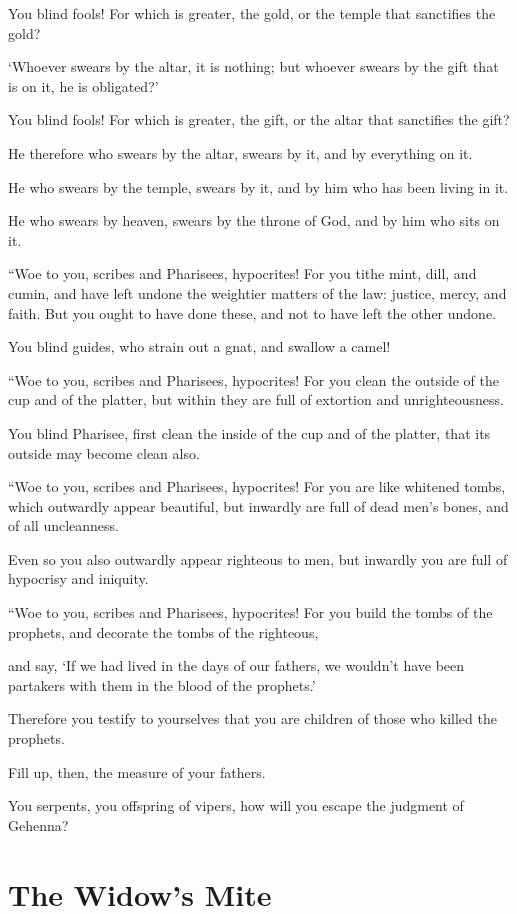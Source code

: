 You blind fools! For which is greater, the gold, or the temple that sanctifies the gold?

‘Whoever swears by the altar, it is nothing; but whoever swears by the gift that is on it, he is obligated?’

You blind fools! For which is greater, the gift, or the altar that sanctifies the gift?

He therefore who swears by the altar, swears by it, and by everything on it.

He who swears by the temple, swears by it, and by him who has been living in it.

He who swears by heaven, swears by the throne of God, and by him who sits on it.

“Woe to you, scribes and Pharisees, hypocrites! For you tithe mint, dill, and cumin, and have left undone the weightier matters of the law: justice, mercy, and faith. But you ought to have done these, and not to have left the other undone.

You blind guides, who strain out a gnat, and swallow a camel!

“Woe to you, scribes and Pharisees, hypocrites! For you clean the outside of the cup and of the platter, but within they are full of extortion and unrighteousness.

You blind Pharisee, first clean the inside of the cup and of the platter, that its outside may become clean also.

“Woe to you, scribes and Pharisees, hypocrites! For you are like whitened tombs, which outwardly appear beautiful, but inwardly are full of dead men’s bones, and of all uncleanness.

Even so you also outwardly appear righteous to men, but inwardly you are full of hypocrisy and iniquity.

“Woe to you, scribes and Pharisees, hypocrites! For you build the tombs of the prophets, and decorate the tombs of the righteous,

and say, ‘If we had lived in the days of our fathers, we wouldn’t have been partakers with them in the blood of the prophets.’

Therefore you testify to yourselves that you are children of those who killed the prophets.

Fill up, then, the measure of your fathers.

You serpents, you offspring of vipers, how will you escape the judgment of Gehenna?


\clearpage \section*{The Widow's Mite}

